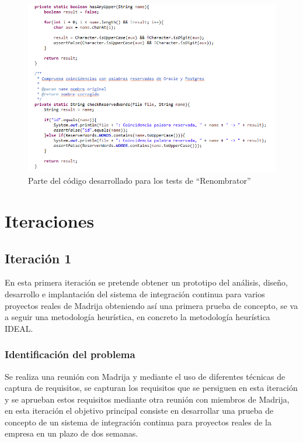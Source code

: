 \begin{figure}[!h]
\centering
   \includegraphics[width=15cm]{Renombrator.PNG}
\caption{Parte del código desarrollado para los tests de ``Renombrator''}
\end{figure}

\section{Iteraciones}

\subsection{Iteración 1}

En esta primera iteración se pretende obtener un prototipo del análisis, diseño, desarrollo e implantación del sistema de integración continua para varios proyectos reales de \ac{Madrija} obteniendo así una primera prueba de concepto, se va a seguir una metodología heurística, en concreto la metodología heurística IDEAL.

\subsubsection{Identificación del problema}

Se realiza una reunión con \ac{Madrija} y mediante el uso de diferentes técnicas de captura de requisitos, se capturan los requisitos que se persiguen en esta iteración y se aprueban estos requisitos mediante otra reunión con miembros de \ac{Madrija}, en esta iteración el objetivo principal consiste en desarrollar una prueba de concepto de un sistema de integración continua para proyectos reales de la empresa en un plazo de dos semanas. %

